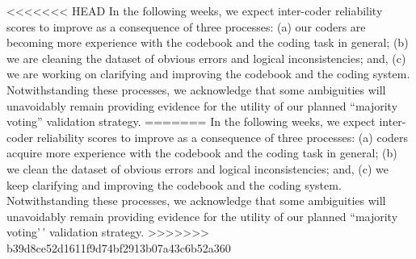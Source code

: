 \documentclass[]{article}
\begin{document}
<<<<<<< HEAD
In the following weeks, we expect inter-coder reliability scores to improve as a consequence of three processes: (a) our coders are becoming more experience with the codebook and the coding task in general; (b) we are cleaning the dataset of obvious errors and logical inconsistencies; and, (c) we are working on clarifying and improving the codebook and the coding system. Notwithstanding these processes, we acknowledge that some ambiguities will unavoidably remain providing evidence for the utility of our planned ``majority voting'' validation strategy.
=======
In the following weeks, we expect inter-coder reliability scores to improve as a consequence of three processes: (a) coders acquire more experience with the codebook and the coding task in general; (b) we clean the dataset of obvious errors and logical inconsistencies; and, (c) we keep clarifying and improving the codebook and the coding system. Notwithstanding these processes, we acknowledge that some ambiguities will unavoidably remain providing evidence for the utility of our planned ``majority voting'\,' validation strategy.
>>>>>>> b39d8ce52d1611f9d74bf2913b07a43c6b52a360
\end{document}
